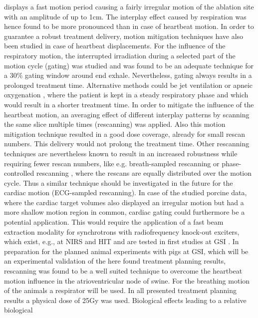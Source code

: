 displays a fast motion period causing a fairly irregular motion of the ablation site with an amplitude of up to 1cm. The interplay effect 
caused by respiration was hence found to be more pronounced than in case of heartbeat motion. In order to guarantee a robust treatment 
delivery, motion mitigation techniques have also been studied in case of heartbeat displacements. 
For the influence of the respiratory motion, the interrupted irradiation during a selected part of the motion cycle (gating) \cite{Kub96} was 
studied and was found to be an adequate technique for a 30\% gating window around end exhale. Nevertheless, gating always results in a 
prolonged treatment time. Alternative methods could be jet ventilation \cite{Hof03} or apneic oxygenation \cite{RPTC12}, where the patient is 
kept in a steady respiratory phase and which would result in a shorter treatment time. 
In order to mitigate the influence of the heartbeat motion, an averaging effect of different interplay patterns by scanning the same slice 
multiple times (rescanning) \cite{Phi92} was applied. Also this motion mitigation technique resulted in a good dose coverage, already for small 
rescan numbers. This delivery would not prolong the treatment time. Other rescanning techniques are nevertheless known to result in an 
increased robustness while requiring fewer rescan numbers, like e.g. breath-sampled rescanning \cite{Sec09} or phase-controlled rescanning 
\cite{Fur07}, where the rescans are equally distributed over the motion cycle. Thus a similar technique should be investigated in the 
future for the cardiac motion (ECG-sampled rescanning). In case of the studied porcine data, where the cardiac target volumes also displayed 
an irregular motion but had a more shallow motion region in common, cardiac gating could furthermore be a potential application. This would 
require the application of a fast beam extraction modality for synchrotrons with radiofrequency knock-out exciters, which exist, e.g., at  
NIRS \cite{Nod96, Fur05} and HIT \cite{Schoe11} and are tested in first studies at GSI \cite{Ber09}. In preparation for the planned 
animal experiments with pigs at GSI, which will be an experimental validation of the here found treatment planning results, rescanning 
was found to be a well suited technique to overcome the heartbeat motion influence in the atrioventricular node of swine. For the breathing 
motion of the animals a respirator will be used. \newline
\newline
In all presented treatment planning results a physical dose of 25Gy was used. Biological effects leading to a relative biological 
